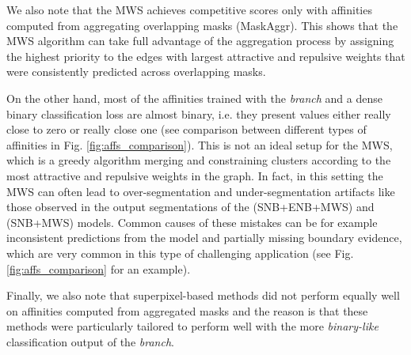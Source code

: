 We also note that the MWS achieves competitive scores only with affinities computed from aggregating overlapping masks (MaskAggr).
This shows that the MWS algorithm can take full advantage of the \maskname aggregation process by assigning the highest priority to the edges with largest attractive and repulsive weights that were consistently predicted across overlapping masks.

On the other hand, most of the affinities trained with the \emph{\sparseBr} \linebreak \emph{branch} and a dense binary classification loss are almost binary, i.e. they present values either really close to zero or really close one (see comparison between different types of affinities in Fig. \ref{fig:affs_comparison}).
This is not an ideal setup for the MWS, which is a greedy algorithm merging and constraining clusters according to the most attractive and repulsive weights in the graph.
In fact, in this setting the MWS can often lead to over-segmentation and under-segmentation artifacts like those observed in the output segmentations of the (SNB+ENB+MWS) and (SNB+MWS) models. Common causes of these mistakes can be for example inconsistent predictions from the model and partially missing boundary evidence, which are very common in this type of challenging application (see Fig. \ref{fig:affs_comparison} for an example). 

Finally, we also note that superpixel-based methods did not perform equally well on affinities computed from aggregated masks and the reason is that these methods were particularly tailored to perform well with the more \emph{binary-like} classification output of the \emph{\sparseBr branch}.



